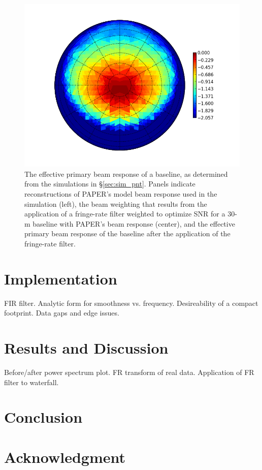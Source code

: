 \documentclass[twocolumn,apj,numberedappendix]{emulateapj}
\begin{document}
\begin{figure}\centering
\includegraphics[width=.6\columnwidth]{plots/beam_fng.png}
\caption{
The effective primary beam response of a baseline, as determined from the simulations in \S\ref{sec:sim_pnt}.
Panels indicate reconstructions of PAPER's model beam response used in the simulation (left), the 
beam weighting that results from the application of a fringe-rate filter weighted to optimize SNR for
a 30-m baseline with PAPER's beam response (center), and the effective primary beam response of the
baseline after the application of the fringe-rate filter.
}\label{fig:}
\end{figure}


\section{Implementation}

FIR filter.  Analytic form for smoothness vs. frequency.
Desireability of a compact footprint.  Data gaps and edge issues.

\section{Results and Discussion}
\label{sec:results}

Before/after power spectrum plot.
FR transform of real data.
Application of FR filter to waterfall.  

\section{Conclusion}
\label{sec:conclusion}

\section{Acknowledgment}

\end{document}
